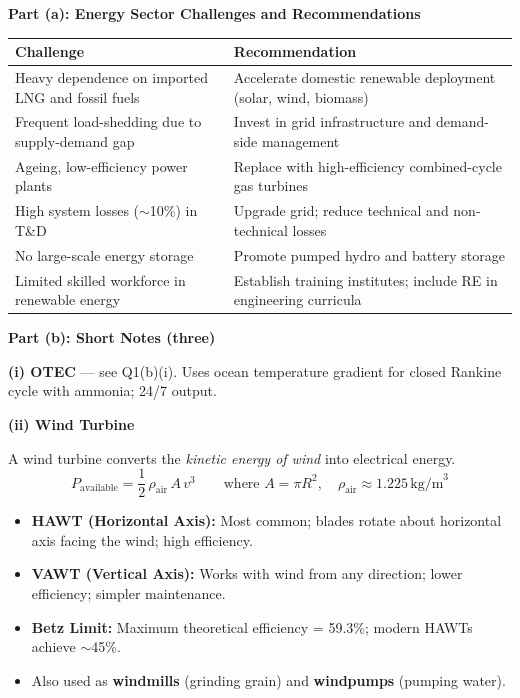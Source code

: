 \documentclass[12pt,a3paper]{article}
\begin{document}
\begin{enumerate}
\begin{tcolorbox}[enhanced,breakable,ansbox,colback=cA!4,colframe=cA,
  boxrule=0.8pt,arc=5pt,
  title={\textbf{Answer}},fonttitle=\bfseries\color{white},colbacktitle=cA]

\textbf{Part (a): Energy Sector Challenges and Recommendations}

\begin{center}
\small
\begin{tabular}{@{}p{6.2cm}p{7.3cm}@{}}
\toprule
\textbf{Challenge} & \textbf{Recommendation} \\
\midrule
Heavy dependence on imported LNG and fossil fuels & Accelerate domestic renewable deployment (solar, wind, biomass) \\[4pt]
Frequent load-shedding due to supply-demand gap & Invest in grid infrastructure and demand-side management \\[4pt]
Ageing, low-efficiency power plants & Replace with high-efficiency combined-cycle gas turbines \\[4pt]
High system losses ($\sim$10\%) in T\&D & Upgrade grid; reduce technical and non-technical losses \\[4pt]
No large-scale energy storage & Promote pumped hydro and battery storage \\[4pt]
Limited skilled workforce in renewable energy & Establish training institutes; include RE in engineering curricula \\
\bottomrule
\end{tabular}
\end{center}

\hrulefill

\textbf{Part (b): Short Notes (three)}

\medskip
\textbf{(i) OTEC} — see Q1(b)(i). Uses ocean temperature gradient for closed Rankine cycle with ammonia; 24/7 output.

\medskip
\textbf{(ii) Wind Turbine}

A wind turbine converts the \emph{kinetic energy of wind} into electrical energy.
\[
  P_{\text{available}} = \frac{1}{2}\,\rho_{\text{air}}\,A\,v^3
  \qquad \text{where } A = \pi R^2,\quad \rho_{\text{air}} \approx 1.225\,\text{kg/m}^3
\]

\begin{itemize}[leftmargin=1.5em,itemsep=2pt]
  \item \textbf{HAWT (Horizontal Axis):} Most common; blades rotate about horizontal axis facing the wind; high efficiency.
  \item \textbf{VAWT (Vertical Axis):} Works with wind from any direction; lower efficiency; simpler maintenance.
  \item \textbf{Betz Limit:} Maximum theoretical efficiency = 59.3\%; modern HAWTs achieve $\sim$45\%.
  \item Also used as \textbf{windmills} (grinding grain) and \textbf{windpumps} (pumping water).
\end{itemize}


\end{tcolorbox}
\end{enumerate}
\end{document}
